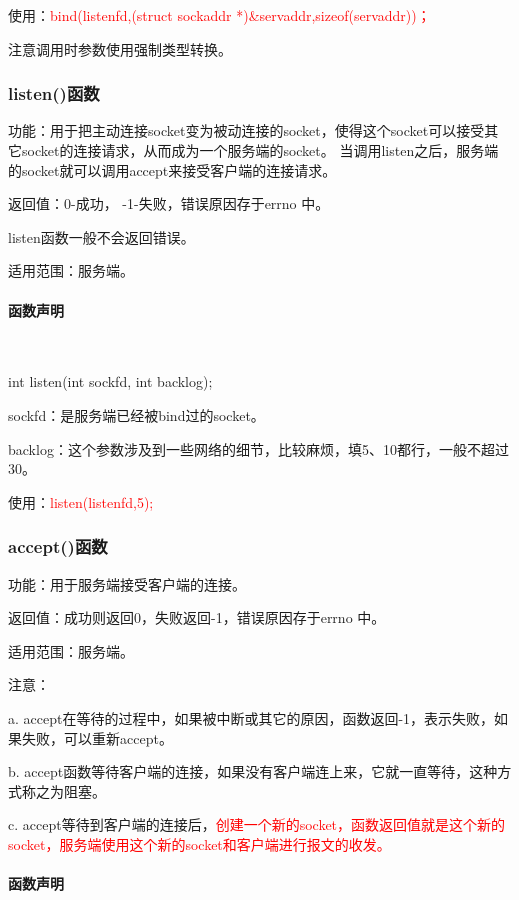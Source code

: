 \documentclass[UTF8]{article}%
\begin{document}
使用：\textcolor{red}{bind(listenfd,(struct sockaddr *)\&servaddr,sizeof(servaddr))；}

注意调用时参数使用强制类型转换。

\subsubsection{listen()函数}

功能：用于把主动连接socket变为被动连接的socket，使得这个socket可以接受其它socket的连接请求，从而成为一个服务端的socket。 当调用listen之后，服务端的socket就可以调用accept来接受客户端的连接请求。

返回值：0-成功， -1-失败，错误原因存于errno 中。

listen函数一般不会返回错误。

适用范围：服务端。

\paragraph{函数声明}~{}

int listen(int sockfd, int backlog);

sockfd：是服务端已经被bind过的socket。

backlog：这个参数涉及到一些网络的细节，比较麻烦，填5、10都行，一般不超过30。

使用：\textcolor{red}{listen(listenfd,5);}

\subsubsection{accept()函数}

功能：用于服务端接受客户端的连接。

返回值：成功则返回0，失败返回-1，错误原因存于errno 中。

适用范围：服务端。

注意：

a. accept在等待的过程中，如果被中断或其它的原因，函数返回-1，表示失败，如果失败，可以重新accept。

b. accept函数等待客户端的连接，如果没有客户端连上来，它就一直等待，这种方式称之为阻塞。

c. accept等待到客户端的连接后，\textcolor{red}{创建一个新的socket，函数返回值就是这个新的socket，服务端使用这个新的socket和客户端进行报文的收发。}

\paragraph{函数声明}~{}
\end{document}
